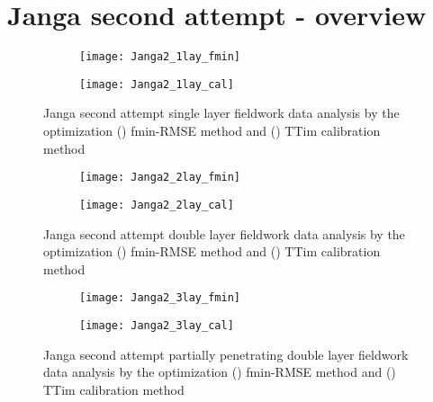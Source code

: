 \clearpage\section{Janga second attempt - overview}
\label{sec:Janga2_overview}

\begin{figure}[h!]
	\centering
	\begin{subfigure}[b]{\linewidth}
		\centering\texttt{[image: Janga2\_1lay\_fmin]}
		\captionsetup{justification=centering}		
		\caption{\label{fig:Janga2_1lay_fmin}}
		\end{subfigure}\vfill
	\begin{subfigure}[b]{\linewidth}
		\centering\texttt{[image: Janga2\_1lay\_cal]}
		\captionsetup{justification=centering}		
		\caption{\label{fig:Janga2_1lay_cal}}
		\end{subfigure}
	\captionsetup{justification=centering}	
	\caption{Janga second attempt single layer fieldwork data analysis by the optimization () fmin-RMSE method and () TTim calibration method} 
	\label{fig:Janga2_1lay_analysis}
\end{figure} 

\begin{figure}[h!]
	\centering
	\begin{subfigure}[b]{\linewidth}
		\centering\texttt{[image: Janga2\_2lay\_fmin]}
		\captionsetup{justification=centering}		
		\caption{\label{fig:Janga2_2lay_fmin}}
		\end{subfigure}\vfill
	\begin{subfigure}[b]{\linewidth}
		\centering\texttt{[image: Janga2\_2lay\_cal]}
		\captionsetup{justification=centering}		
		\caption{\label{fig:Janga2_2lay_cal}}
		\end{subfigure}
	\captionsetup{justification=centering}	
	\caption{Janga second attempt double layer fieldwork data analysis by the optimization () fmin-RMSE method and () TTim calibration method} 
	\label{fig:Janga2_2lay_analysis}
\end{figure} 

\begin{figure}[h!]
	\centering
	\begin{subfigure}[b]{\linewidth}
		\centering\texttt{[image: Janga2\_3lay\_fmin]}
		\captionsetup{justification=centering}		
		\caption{\label{fig:Janga2_3lay_fmin}}
		\end{subfigure}\vfill
	\begin{subfigure}[b]{\linewidth}
		\centering\texttt{[image: Janga2\_3lay\_cal]}
		\captionsetup{justification=centering}		
		\caption{\label{fig:Janga2_3lay_cal}}
		\end{subfigure}
	\captionsetup{justification=centering}	
	\caption{Janga second attempt partially penetrating double layer fieldwork data analysis by the optimization () fmin-RMSE method and () TTim calibration method} 
	\label{fig:Janga2_3lay_analysis}
\end{figure} 

